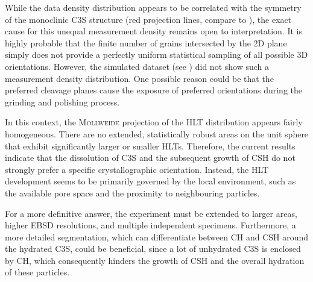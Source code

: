 While the data density distribution appears to be correlated with the symmetry of the monoclinic \ac{C3S} structure (red projection lines, compare to ), the exact cause for this unequal measurement density remains open to interpretation.
It is highly probable that the finite number of grains intersected by the 2D plane simply does not provide a perfectly uniform statistical sampling of all possible 3D orientations.
However, the simulated dataset (see ) did not show such a measurement density distribution.
One possible reason could be that the preferred cleavage planes cause the exposure of preferred orientations during the grinding and polishing process.

In this context, the \textsc{Mollweide} projection of the \ac{HLT} distribution appears fairly homogeneous.
There are no extended, statistically robust areas on the unit sphere that exhibit significantly larger or smaller \ac{HLT}s.
Therefore, the current results indicate that the dissolution of \ac{C3S} and the subsequent growth of \ac{CSH} do not strongly prefer a specific crystallographic orientation.
Instead, the \ac{HLT} development seems to be primarily governed by the local environment, such as the available pore space and the proximity to neighbouring particles.

For a more definitive answer, the experiment must be extended to larger areas, higher \ac{EBSD} resolutions, and multiple independent specimens.
Furthermore, a more detailed segmentation, which can differentiate between \ac{CH} and \ac{CSH} around the hydrated \ac{C3S}, could be beneficial, since a lot of unhydrated \ac{C3S} is enclosed by \ac{CH}, which consequently hinders the growth of \ac{CSH} and the overall hydration of these particles.

\FloatBarrier